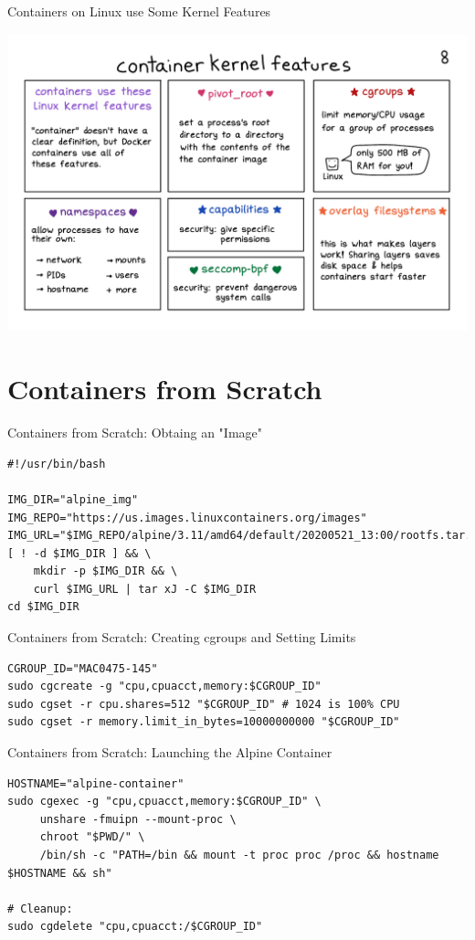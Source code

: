 \documentclass[10pt, compress, aspectratio=169, xcolor={table,usenames,dvipsnames}]{beamer}
\begin{document}
\begin{frame}[label={sec:org4c0f4d0}]{Containers on Linux use Some Kernel Features}
\begin{center}
\includegraphics[width=.86\columnwidth]{../../img/how-containers-work_pg8.pdf}
\end{center}
\end{frame}
\section{Containers from Scratch}
\label{sec:org3e1c6bb}
\begin{frame}[label={sec:orge64232d},fragile]{Containers from Scratch: Obtaing an "Image"}
 \lstset{language=bash,label= ,caption= ,captionpos=b,numbers=none}
\begin{lstlisting}
#!/usr/bin/bash

IMG_DIR="alpine_img"
IMG_REPO="https://us.images.linuxcontainers.org/images"
IMG_URL="$IMG_REPO/alpine/3.11/amd64/default/20200521_13:00/rootfs.tar.xz"
[ ! -d $IMG_DIR ] && \
    mkdir -p $IMG_DIR && \
    curl $IMG_URL | tar xJ -C $IMG_DIR
cd $IMG_DIR
\end{lstlisting}
\end{frame}
\begin{frame}[label={sec:org91d2421},fragile]{Containers from Scratch: Creating cgroups and Setting Limits}
 \lstset{language=bash,label= ,caption= ,captionpos=b,numbers=none}
\begin{lstlisting}
CGROUP_ID="MAC0475-145"
sudo cgcreate -g "cpu,cpuacct,memory:$CGROUP_ID"
sudo cgset -r cpu.shares=512 "$CGROUP_ID" # 1024 is 100% CPU
sudo cgset -r memory.limit_in_bytes=10000000000 "$CGROUP_ID"
\end{lstlisting}
\end{frame}

\begin{frame}[label={sec:org1017276},fragile]{Containers from Scratch: Launching the Alpine Container}
 \lstset{language=bash,label= ,caption= ,captionpos=b,numbers=none}
\begin{lstlisting}
HOSTNAME="alpine-container"
sudo cgexec -g "cpu,cpuacct,memory:$CGROUP_ID" \
     unshare -fmuipn --mount-proc \
     chroot "$PWD/" \
     /bin/sh -c "PATH=/bin && mount -t proc proc /proc && hostname $HOSTNAME && sh"

# Cleanup:
sudo cgdelete "cpu,cpuacct:/$CGROUP_ID"
\end{lstlisting}
\end{frame}
\end{document}

